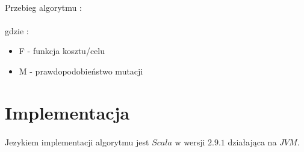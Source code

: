 \documentclass[wide,a4paper,titlepage,12pt] {article}
\begin{document}
\paragraph{}
Przebieg algorytmu :
\lstset{ %
    language=java,                %
    basicstyle=\scriptsize,       %
    numbers=left,                   %
    numberstyle=\scriptsize,      %
    stepnumber=10,                   %
    numbersep=9pt,                  %
    showspaces=false,               %
    showstringspaces=false,         %
    showtabs=false,                 %
    breaklines=true,                %
    }
    
    \paragraph{}
    gdzie :
    \begin{itemize}
        \item F - funkcja kosztu/celu
        \item M - prawdopodobieństwo mutacji

    \end{itemize}
\newpage
\section{Implementacja}
\paragraph{}
Jezykiem implementacji algorytmu jest $Scala$ w wersji $2.9.1$ działająca na $JVM$.
\end{document}
